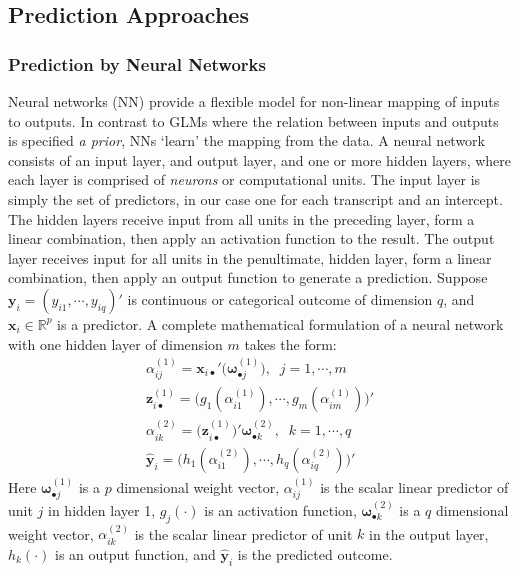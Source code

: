 \documentclass[a4paper]{article}
\begin{document}
\subsection{Prediction Approaches}

\subsubsection{Prediction by Neural Networks}

Neural networks (NN) provide a flexible model for non-linear mapping of inputs to outputs. In contrast to GLMs where the relation between inputs and outputs is specified \textit{a prior}, NNs `learn' the mapping from the data. A neural network consists of an input layer, and output layer, and one or more hidden layers, where each layer is comprised of \textit{neurons} or computational units. The input layer is simply the set of predictors, in our case one for each transcript and an intercept. The hidden layers receive input from all units in the preceding layer, form a linear combination, then apply an activation function to the result. The output layer receives input for all units in the penultimate, hidden layer, form a linear combination, then apply an output function to generate a prediction. Suppose  $\bm{y}_{i} = (y_{i1},\cdots,y_{iq})'$ is continuous or categorical outcome of dimension $q$, and $\bm{x}_{i}\in\mathbb{R}^{p}$ is a predictor. A complete mathematical formulation of a neural network with one hidden layer of dimension $m$ takes the form:
\begin{gather}
\alpha_{ij}^{(1)} =\bm{x}_{i\bullet}'\Big(\bm{\omega}_{\bullet j}^{(1)}\Big),\;\; j = 1,\cdots,m \\
\bm{z}_{i\bullet}^{(1)} = \big(g_{1}(\alpha_{i1}^{(1)}),\cdots,g_{m}(\alpha_{im}^{(1)})\big)' \\
\alpha_{ik}^{(2)} = \Big(\bm{z}_{i \bullet}^{(1)}\Big)'\bm{\omega}_{\bullet k}^{(2)},\;\; k = 1,\cdots,q \\
\bm{\hat y}_{i} = \big(h_{1}(\alpha_{i1}^{(2)}),\cdots,h_{q}(\alpha_{iq}^{(2)})\big)'
\end{gather}
Here $\bm{\omega}_{\bullet j}^{(1)}$ is a $p$ dimensional weight vector, $\alpha_{ij}^{(1)}$ is the scalar linear predictor of unit $j$ in hidden layer 1, $g_{j}(\cdot)$ is an activation function, $\bm{\omega}_{\bullet k}^{(2)}$ is a $q$ dimensional weight vector, $\alpha_{ik}^{(2)}$ is the scalar linear predictor of unit $k$ in the output layer, $h_{k}(\cdot)$ is an output function, and $\bm{\hat{y}}_{i}$ is the predicted outcome. 
\end{document}
